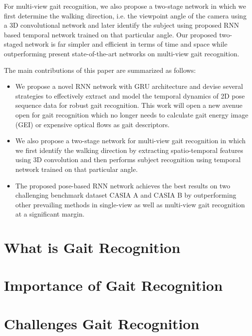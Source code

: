 For multi-view gait recognition, we also propose a two-stage network in which we first determine the walking direction, i.e. the viewpoint angle of the camera using a 3D convolutional network and later identify the subject using proposed RNN based temporal network trained on that particular angle. Our proposed two-staged network is far simpler and efficient in terms of time and space while outperforming present state-of-the-art networks on multi-view gait recognition.


The main contributions of this paper are summarized as follows:
\begin{itemize}
	\item We propose a novel RNN network with GRU architecture and devise several strategies to effectively extract and model the temporal dynamics of 2D pose sequence data for robust gait recognition. This work will open a new avenue open for gait recognition which no longer needs to calculate gait energy image (GEI) or expensive optical flows as gait descriptors.
	
	\item We also propose a two-stage network for multi-view gait recognition in which we first identify the walking direction by extracting spatio-temporal features using 3D convolution and then performs subject recognition using temporal network trained on that particular angle.
	
	\item The proposed pose-based RNN network achieves the best results on two challenging benchmark dataset CASIA A and CASIA B by outperforming other prevailing methods in single-view as well as multi-view gait recognition at a significant margin.
	
\end{itemize}


\section{What is Gait Recognition}
\section{Importance of Gait Recognition}
\section{Challenges Gait Recognition}
